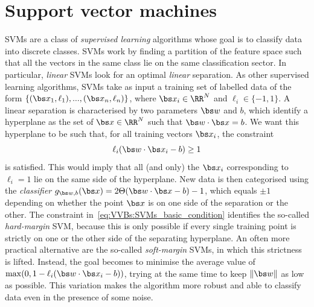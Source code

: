 \section{Support vector machines}
\label{sec:VVBs:SVMs}


\acfp{SVM} are a class of \emph{supervised learning} algorithms whose goal is to classify data into discrete classes. \acp{SVM} work by finding a partition of the feature space such that all the vectors in the same class lie on the same classification sector.
In particular, \emph{linear} \acp{SVM} look for an optimal \emph{linear} separation.
As other supervised learning algorithms, SVMs take as input a training set of labelled data of the form $\{(\bs x_1,\ell_1),...,(\bs x_n,\ell_n)\}$, where $\bs x_i\in\RR^N$ and $\ell_i\in\{-1,1\}$.
A linear separation is characterised by two parameters $\bs w$ and $b$, which identify a hyperplane as the set of $\bs x\in\RR^N$ such that $\bs w\cdot\bs x=b$. We want this hyperplane to be such that, for all training vectors $\bs x_i$, the constraint
\begin{equation}
	\ell_i(\bs w\cdot\bs x_i-b)\ge1
	\label{eq:VVBs:SVMs_basic_condition}
\end{equation}
is satisfied. This would imply that all (and only) the $\bs x_i$ corresponding to $\ell_i=1$ lie on the same side of the hyperplane.
New data is then categorised using the \emph{classifier} $g_{\bs w,b}(\bs x)=2\Theta(\bs w\cdot\bs x-b)-1$, which equals $\pm1$ depending on whether the point $\bs x$ is on one side of the separation or the other.
The constraint in~\cref{eq:VVBs:SVMs_basic_condition} identifies the so-called \emph{hard-margin} SVM, because this is only possible if every single training point is strictly on one or the other side of the separating hyperplane.
An often more practical alternative are the so-called \emph{soft-margin} SVMs, in which this strictness is lifted. Instead, the goal becomes to minimise the average value of
$\max(0, 1- \ell_i (\bs w\cdot\bs x_i- b))$, trying at the same time to keep $\|\bs w\|$ as low as possible. This variation makes the algorithm more robust and able to classify data even in the presence of some noise.

